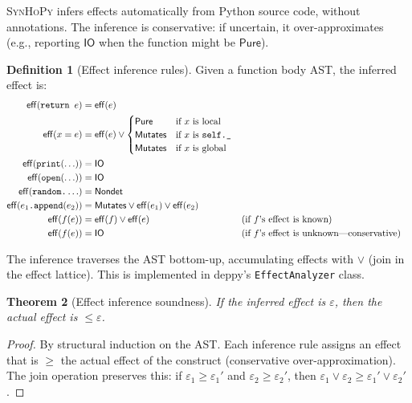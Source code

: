 \documentclass[11pt,a4paper]{report}
\theoremstyle{definition}
\newtheorem{definition}{Definition}[chapter]
\theoremstyle{plain}
\newtheorem{theorem}[definition]{Theorem}
\newcommand{\Pure}{\mathsf{Pure}}
\newcommand{\Mutates}{\mathsf{Mutates}}
\newcommand{\IO}{\mathsf{IO}}
\newcommand{\Nondet}{\mathsf{Nondet}}
\newcommand{\synhopy}{\textsc{SynHoPy}}
\begin{document}
\synhopy{} infers effects automatically from Python source code, without
annotations.  The inference is conservative: if uncertain, it over-approximates
(e.g., reporting $\IO$ when the function might be $\Pure$).

\begin{definition}[Effect inference rules]
Given a function body AST, the inferred effect is:
\begin{align}
  \mathsf{eff}(\texttt{return } e) &= \mathsf{eff}(e) \\
  \mathsf{eff}(x = e) &= \mathsf{eff}(e) \vee
    \begin{cases}
      \Pure & \text{if $x$ is local} \\
      \Mutates & \text{if $x$ is \texttt{self.\_}} \\
      \Mutates & \text{if $x$ is global}
    \end{cases} \\
  \mathsf{eff}(\texttt{print}(\ldots)) &= \IO \\
  \mathsf{eff}(\texttt{open}(\ldots)) &= \IO \\
  \mathsf{eff}(\texttt{random.}\ldots) &= \Nondet \\
  \mathsf{eff}(e_1\texttt{.append}(e_2)) &= \Mutates \vee \mathsf{eff}(e_1) \vee \mathsf{eff}(e_2) \\
  \mathsf{eff}(f(e)) &= \mathsf{eff}(f) \vee \mathsf{eff}(e) && \text{(if $f$'s effect is known)} \\
  \mathsf{eff}(f(e)) &= \IO && \text{(if $f$'s effect is unknown---conservative)}
\end{align}
\end{definition}

The inference traverses the AST bottom-up, accumulating effects with $\vee$
(join in the effect lattice).  This is implemented in deppy's
\texttt{EffectAnalyzer} class.

\begin{theorem}[Effect inference soundness]
If the inferred effect is $\varepsilon$, then the actual effect is $\leq \varepsilon$.
\end{theorem}
\begin{proof}
By structural induction on the AST.  Each inference rule assigns an effect
that is $\geq$ the actual effect of the construct (conservative over-approximation).
The join operation preserves this: if $\varepsilon_1 \geq \varepsilon_1'$ and
$\varepsilon_2 \geq \varepsilon_2'$, then
$\varepsilon_1 \vee \varepsilon_2 \geq \varepsilon_1' \vee \varepsilon_2'$.
\end{proof}
\end{document}
